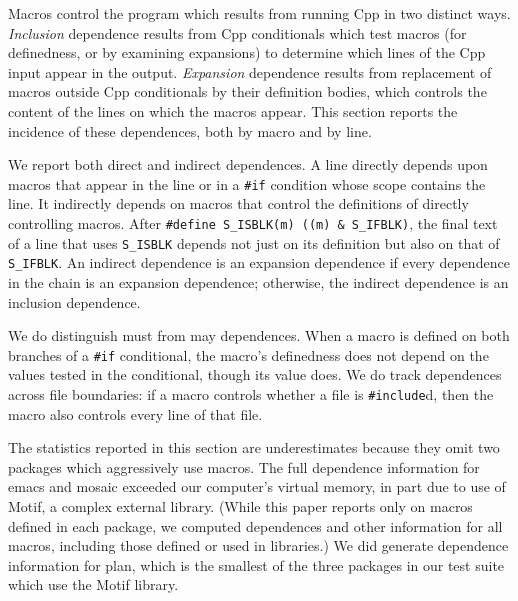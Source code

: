 \documentclass[10pt]{article}
\newcommand{\pkg}[1]{\textsf{#1}}
\begin{document}
Macros control the program which results from running Cpp in two distinct
ways.  {\em Inclusion} dependence results from Cpp conditionals which test
macros (for definedness, or by examining expansions) to determine which
lines of the Cpp input appear in the output.  {\em Expansion} dependence
results from replacement of macros outside Cpp conditionals by their
definition bodies, which controls the content of the lines on which the
macros appear.  This section reports the incidence of these dependences,
both by macro and by line.

We report both direct and indirect dependences.  A line directly depends
upon macros that appear in the line or in a {\tt \#if} condition whose
scope contains the line.  It indirectly depends on macros that control the
definitions of directly controlling macros.  After {\tt \#define
\verb|S_ISBLK|(m) ((m)~\&~\verb|S_IFBLK|)}, the final text of a line that
uses \verb|S_ISBLK| depends not just on its definition but also on that of
\verb|S_IFBLK|.  An indirect dependence is an expansion dependence if every
dependence in the chain is an expansion dependence; otherwise, the indirect
dependence is an inclusion dependence.

We do distinguish must from may dependences.  When a macro is defined on
both branches of a {\tt \#if} conditional, the macro's definedness does not
depend on the values tested in the conditional, though its value does.  We
do track dependences across file boundaries: if a macro controls whether a
file is {\tt \#include}d, then the macro also controls every line of that
file.


The statistics reported in this section are underestimates because they
omit two packages which aggressively use macros.  The full dependence
information for \pkg{emacs} and \pkg{mosaic} exceeded our computer's
virtual memory, in part due to use of Motif, a complex external library.
(While this paper reports only on macros defined in each package, we
computed dependences and other information for all macros, including those
defined or used in libraries.)  We did generate dependence information for
\pkg{plan}, which is the smallest of the three packages in our test suite
which use the Motif library.
\end{document}
